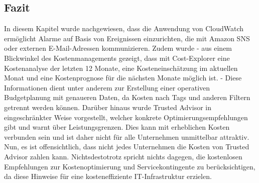 \subsection*{Fazit}
In diesem Kapitel wurde nachgewiesen, dass die Anwendung von CloudWatch ermöglicht Alarme auf Basis von Ereignissen einzurichten, die mit Amazon SNS oder externen E-Mail-Adressen kommunizieren. %
Zudem wurde - aus einem Blickwinkel des Kostenmanagements gezeigt, dass mit Cost-Explorer eine Kostenanalyse der letzten 12 Monate, eine Kosteneinschätzung im aktuellen Monat und eine Kostenprognose für die nächsten Monate möglich ist. - Diese Informationen dient unter anderem zur Erstellung einer operativen Budgetplanung mit genaueren Daten, da
Kosten nach Tags und anderen Filtern getrennt werden können.
Darüber hinaus wurde Trusted Advisor in eingeschränkter Weise vorgestellt, welcher konkrete Optimierungsempfehlungen gibt und warnt über Leistungsgrenzen. Dies kann mit erheblichen Kosten verbunden sein und ist daher nicht für alle Unternehmen unmittelbar attraktiv. Nun, es ist offensichtlich, dass nicht jedes Unternehmen die Kosten von Trusted Advisor zahlen kann. Nichtsdestotrotz spricht nichts dagegen, %
die kostenlosen Empfehlungen zur Kostenoptimierung und Servicekontingente zu berücksichtigen, da diese Hinweise für eine kosteneffiziente IT-Infrastruktur erzielen.

